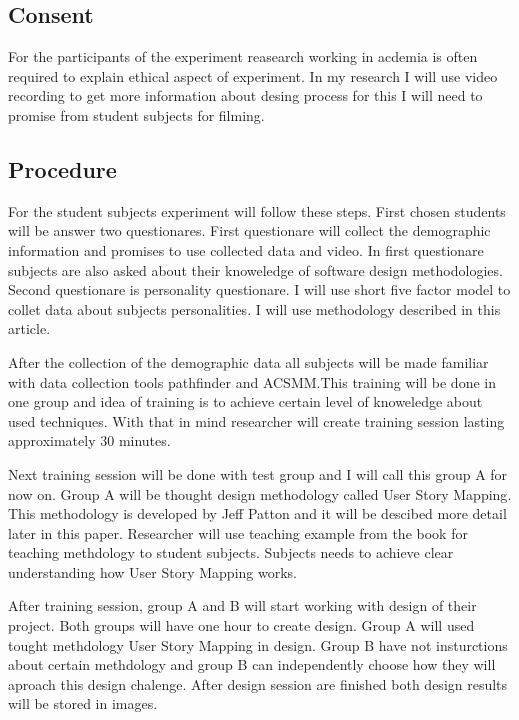 \documentclass[english]{tktltiki2}
\theoremstyle{definition}
\theoremstyle{remark}
\begin{document}
\subsection{Consent}

For the participants of the experiment reasearch working in acdemia is often required to explain ethical aspect of experiment\cite{experiment}. In my research I will use video recording to get more information about desing process for this I will need to promise from student subjects for filming.

\subsection{Procedure}

For the student subjects experiment will follow these steps. First chosen students will be answer two questionares. First questionare will collect the demographic information and promises to use collected data and video. In first questionare subjects are also asked about their knoweledge of software design methodologies. Second questionare is personality questionare. I will use short five factor model to collet data about subjects personalities. I will use methodology described in this article\cite{fiveFactor}.

After the collection of the demographic data all subjects will be made familiar with data collection tools pathfinder\cite{pathfinder} and ACSMM\cite{acsmm}.This training will be done in one group and idea of training is to achieve certain level of knoweledge about used techniques. With that in mind researcher will create training session lasting approximately 30 minutes.

Next training session will be done with test group and I will call this group A for now on. Group A will be thought design methodology called User Story Mapping\cite{userStoryMapping}. This methodology is developed by Jeff Patton and it will be descibed more detail later in this paper. Researcher will use teaching example from the book for teaching methdology to student subjects. Subjects needs to achieve clear understanding how User Story Mapping works.

After training session, group A and B will start working with design of their project. Both groups will have one hour to create design. Group A will used tought methdology User Story Mapping in design. Group B have not insturctions about certain methdology and group B can independently choose how they will aproach this design chalenge. After design session are finished both design results will be stored in images.
\end{document}
